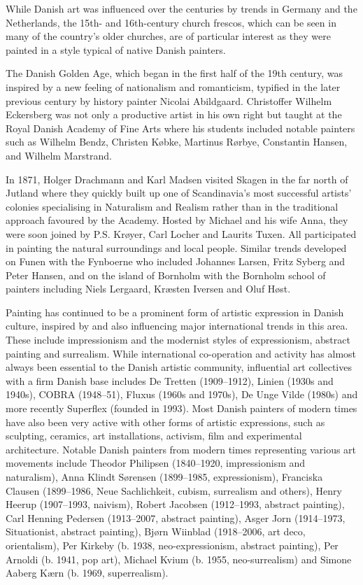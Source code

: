While Danish art was influenced over the centuries by trends in Germany
and the Netherlands, the 15th- and 16th-century church frescos, which
can be seen in many of the country's older churches, are of particular
interest as they were painted in a style typical of native Danish
painters.

The Danish Golden Age, which began in the first half of the 19th
century, was inspired by a new feeling of nationalism and romanticism,
typified in the later previous century by history painter Nicolai
Abildgaard. Christoffer Wilhelm Eckersberg was not only a productive
artist in his own right but taught at the Royal Danish Academy of Fine
Arts where his students included notable painters such as Wilhelm Bendz,
Christen Købke, Martinus Rørbye, Constantin Hansen, and Wilhelm
Marstrand.

In 1871, Holger Drachmann and Karl Madsen visited Skagen in the far
north of Jutland where they quickly built up one of Scandinavia's most
successful artists' colonies specialising in Naturalism and Realism
rather than in the traditional approach favoured by the Academy. Hosted
by Michael and his wife Anna, they were soon joined by P.S. Krøyer, Carl
Locher and Laurits Tuxen. All participated in painting the natural
surroundings and local people. Similar trends developed on Funen with
the Fynboerne who included Johannes Larsen, Fritz Syberg and Peter
Hansen, and on the island of Bornholm with the Bornholm school of
painters including Niels Lergaard, Kræsten Iversen and Oluf Høst.

Painting has continued to be a prominent form of artistic expression in
Danish culture, inspired by and also influencing major international
trends in this area. These include impressionism and the modernist
styles of expressionism, abstract painting and surrealism. While
international co-operation and activity has almost always been essential
to the Danish artistic community, influential art collectives with a
firm Danish base includes De Tretten (1909--1912), Linien (1930s and
1940s), COBRA (1948--51), Fluxus (1960s and 1970s), De Unge Vilde
(1980s) and more recently Superflex (founded in 1993). Most Danish
painters of modern times have also been very active with other forms of
artistic expressions, such as sculpting, ceramics, art installations,
activism, film and experimental architecture. Notable Danish painters
from modern times representing various art movements include Theodor
Philipsen (1840--1920, impressionism and naturalism), Anna Klindt
Sørensen (1899--1985, expressionism), Franciska Clausen (1899--1986,
Neue Sachlichkeit, cubism, surrealism and others), Henry Heerup
(1907--1993, naivism), Robert Jacobsen (1912--1993, abstract painting),
Carl Henning Pedersen (1913--2007, abstract painting), Asger Jorn
(1914--1973, Situationist, abstract painting), Bjørn Wiinblad
(1918--2006, art deco, orientalism), Per Kirkeby (b. 1938,
neo-expressionism, abstract painting), Per Arnoldi (b. 1941, pop art),
Michael Kvium (b. 1955, neo-surrealism) and Simone Aaberg Kærn (b. 1969,
superrealism).

